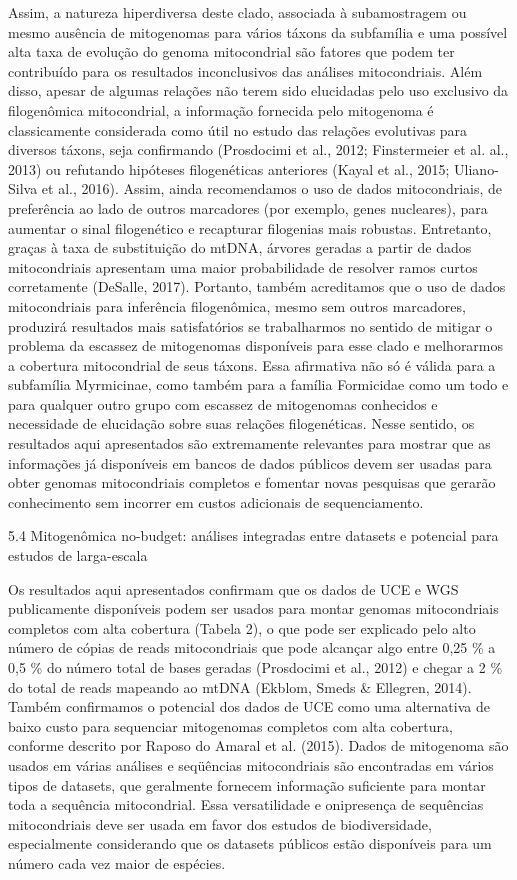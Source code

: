 \documentclass[../DISSERTACAO_MAIN.tex]{subfiles}
\begin{document}
	Assim, a natureza hiperdiversa deste clado, associada à subamostragem ou mesmo ausência de mitogenomas para vários táxons da subfamília e uma possível alta taxa de evolução do genoma mitocondrial são fatores que podem ter contribuído para os resultados inconclusivos das análises mitocondriais. Além disso, apesar de algumas relações não terem sido elucidadas pelo uso exclusivo da filogenômica mitocondrial, a informação fornecida pelo mitogenoma é classicamente considerada como útil no estudo das relações evolutivas para diversos táxons, seja confirmando (Prosdocimi et al., 2012; Finstermeier et al. al., 2013) ou refutando hipóteses filogenéticas anteriores (Kayal et al., 2015; Uliano-Silva et al., 2016). Assim, ainda recomendamos o uso de dados mitocondriais, de preferência ao lado de outros marcadores (por exemplo, genes nucleares), para aumentar o sinal filogenético e recapturar filogenias mais robustas. Entretanto, graças à taxa de substituição do mtDNA, árvores geradas a partir de dados mitocondriais apresentam uma maior probabilidade de resolver ramos curtos corretamente (DeSalle, 2017). Portanto, também acreditamos que o uso de dados mitocondriais para inferência filogenômica, mesmo sem outros marcadores, produzirá resultados mais satisfatórios se trabalharmos no sentido de mitigar o problema da escassez de mitogenomas disponíveis para esse clado e melhorarmos a cobertura mitocondrial de seus táxons. Essa afirmativa não só é válida para a subfamília Myrmicinae, como também para a família Formicidae como um todo e para qualquer outro grupo com escassez de mitogenomas conhecidos e necessidade de elucidação sobre suas relações filogenéticas. Nesse sentido, os resultados aqui apresentados são extremamente relevantes para mostrar que as informações já disponíveis em bancos de dados públicos devem ser usadas para obter genomas mitocondriais completos e fomentar novas pesquisas que gerarão conhecimento sem incorrer em custos adicionais de sequenciamento.
	
	5.4 Mitogenômica no-budget: análises integradas entre datasets e potencial para estudos de larga-escala
	
	Os resultados aqui apresentados confirmam que os dados de UCE e WGS publicamente disponíveis podem ser usados para montar genomas mitocondriais completos com alta cobertura (Tabela 2), o que pode ser explicado pelo alto número de cópias de reads mitocondriais que pode alcançar algo entre 0,25 \% a 0,5 \% do número total de bases geradas (Prosdocimi et al., 2012) e chegar a 2 \% do total de reads mapeando ao mtDNA (Ekblom, Smeds \& Ellegren, 2014). Também confirmamos o potencial dos dados de UCE como uma alternativa de baixo custo para sequenciar mitogenomas completos com alta cobertura, conforme descrito por Raposo do Amaral et al. (2015). Dados de mitogenoma são usados em várias análises e seqüências mitocondriais são encontradas em vários tipos de datasets, que geralmente fornecem informação suficiente para montar toda a sequência mitocondrial. Essa versatilidade e onipresença de sequências mitocondriais deve ser usada em favor dos estudos de biodiversidade, especialmente considerando que os datasets públicos estão disponíveis para um número cada vez maior de espécies.
	
\end{document}
